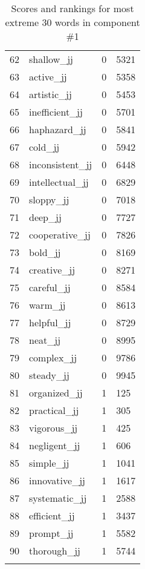 \begin{longtable}[!htbp]{| rlr@{.}l |}
    62 & shallow\_jj & 0 & 5321 \\
    63 & active\_jj & 0 & 5358 \\
    64 & artistic\_jj & 0 & 5453 \\
    65 & inefficient\_jj & 0 & 5701 \\
    66 & haphazard\_jj & 0 & 5841 \\
    67 & cold\_jj & 0 & 5942 \\
    68 & inconsistent\_jj & 0 & 6448 \\
    69 & intellectual\_jj & 0 & 6829 \\
    70 & sloppy\_jj & 0 & 7018 \\
    71 & deep\_jj & 0 & 7727 \\
    72 & cooperative\_jj & 0 & 7826 \\
    73 & bold\_jj & 0 & 8169 \\
    74 & creative\_jj & 0 & 8271 \\
    75 & careful\_jj & 0 & 8584 \\
    76 & warm\_jj & 0 & 8613 \\
    77 & helpful\_jj & 0 & 8729 \\
    78 & neat\_jj & 0 & 8995 \\
    79 & complex\_jj & 0 & 9786 \\
    80 & steady\_jj & 0 & 9945 \\
    81 & organized\_jj & 1 & 125 \\
    82 & practical\_jj & 1 & 305 \\
    83 & vigorous\_jj & 1 & 425 \\
    84 & negligent\_jj & 1 & 606 \\
    85 & simple\_jj & 1 & 1041 \\
    86 & innovative\_jj & 1 & 1617 \\
    87 & systematic\_jj & 1 & 2588 \\
    88 & efficient\_jj & 1 & 3437 \\
    89 & prompt\_jj & 1 & 5582 \\
    90 & thorough\_jj & 1 & 5744 \\
    \hline
    \caption{Scores and rankings for most extreme 30 words in component \#1} \\
\end{longtable}

